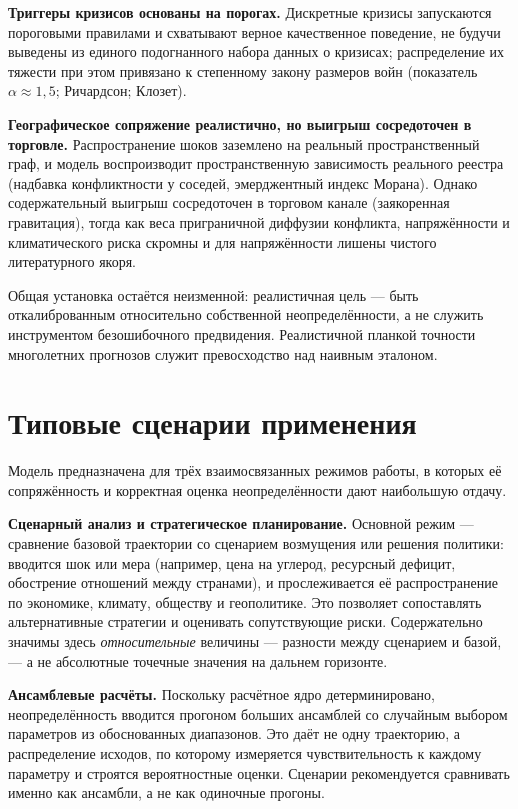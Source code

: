 \documentclass[11pt,a4paper]{article}
\begin{document}
\textbf{Триггеры кризисов основаны на порогах.} Дискретные кризисы запускаются пороговыми правилами
и схватывают верное качественное поведение, не будучи выведены из единого подогнанного набора
данных о кризисах; распределение их тяжести при этом привязано к степенному закону размеров войн
(показатель ${\alpha}{\approx}1{,}5$; Ричардсон; Клозет).

\textbf{Географическое сопряжение реалистично, но выигрыш сосредоточен в торговле.} Распространение
шоков заземлено на реальный пространственный граф, и модель воспроизводит пространственную
зависимость реального реестра (надбавка конфликтности у соседей, эмерджентный индекс Морана). Однако
содержательный выигрыш сосредоточен в торговом канале (заякоренная гравитация), тогда как веса
приграничной диффузии конфликта, напряжённости и климатического риска скромны и для напряжённости
лишены чистого литературного якоря.

Общая установка остаётся неизменной: реалистичная цель --- быть откалиброванным
относительно собственной неопределённости, а не служить инструментом безошибочного
предвидения. Реалистичной планкой точности многолетних прогнозов служит превосходство над
наивным эталоном.

\section{Типовые сценарии применения}
\label{sec:scenarios}

Модель предназначена для трёх взаимосвязанных режимов работы, в которых её сопряжённость и
корректная оценка неопределённости дают наибольшую отдачу.

\textbf{Сценарный анализ и стратегическое планирование.} Основной режим --- сравнение базовой
траектории со сценарием возмущения или решения политики: вводится шок или мера (например, цена
на углерод, ресурсный дефицит, обострение отношений между странами), и прослеживается её
распространение по экономике, климату, обществу и геополитике. Это позволяет сопоставлять
альтернативные стратегии и оценивать сопутствующие риски. Содержательно значимы здесь
\emph{относительные} величины --- разности между сценарием и базой, --- а не абсолютные
точечные значения на дальнем горизонте.

\textbf{Ансамблевые расчёты.} Поскольку расчётное ядро детерминировано, неопределённость
вводится прогоном больших ансамблей со случайным выбором параметров из обоснованных
диапазонов. Это даёт не одну траекторию, а распределение исходов, по которому измеряется
чувствительность к каждому параметру и строятся вероятностные оценки. Сценарии
рекомендуется сравнивать именно как ансамбли, а не как одиночные прогоны.
\end{document}

